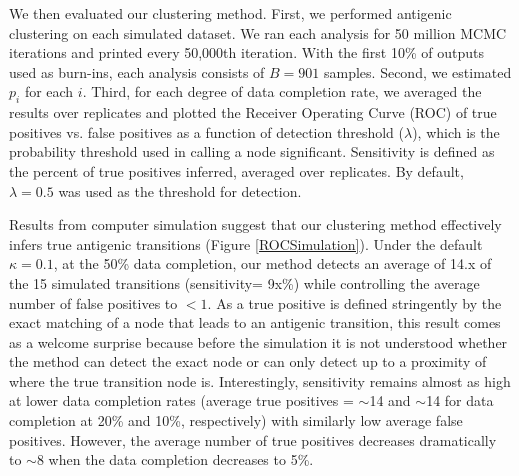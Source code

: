\documentclass[11pt,oneside,letterpaper]{article}
\begin{document}
We then evaluated our clustering method.
First, we performed antigenic clustering on each simulated dataset.
We ran each analysis for 50 million MCMC iterations and printed every 50,000th iteration.
With the first 10\% of outputs used as burn-ins, each analysis consists of $B=901$ samples.
Second, we estimated $p_i$ for each $i$.
Third, for each degree of data completion rate, we averaged the results over replicates and plotted the Receiver Operating Curve (ROC) of true positives vs. false positives as a function of detection threshold ($\lambda$), which is the probability threshold used in calling a node significant.
Sensitivity is defined as the percent of true positives inferred, averaged over replicates. By default, $\lambda=0.5$ was used as the threshold for detection.


Results from computer simulation suggest that our clustering method effectively infers true antigenic transitions (Figure \ref{ROCSimulation}). 
Under the default $\kappa=0.1$, at the 50\% data completion, our method detects an average of 14.x of the 15 simulated transitions (sensitivity= 9x\%) while controlling the average number of false positives to $<1$. 
As a true positive is defined stringently by the exact matching of a node that leads to an antigenic transition, this result comes as a welcome surprise because before the simulation it is not understood whether the method can detect the exact node or can only detect up to a proximity of where the true transition node is.
Interestingly, sensitivity remains almost as high at lower data completion rates (average true positives = $\sim$14 and $\sim$14 for data completion at 20\% and 10\%, respectively) with similarly low average false positives. 
However, the average number of true positives decreases dramatically to $\sim$8 when the data completion decreases to 5\%. 
\end{document}
